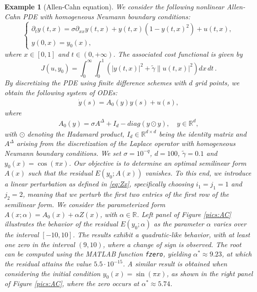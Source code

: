 \documentclass{article}
\newtheorem{example}{Example}[section]
\newcommand{\first}[1]{{\color{black}{#1}}}
\begin{document}
\begin{example}[Allen-Cahn equation]
   We consider the following nonlinear Allen-Cahn PDE with homogeneous Neumann boundary conditions:
\begin{equation*}
\left\{ \begin{array}{l}
\partial_t y(t,x) = \sigma \partial_{xx} y(t,x) + y(t,x) (1-y(t,x)^2) + u(t,x),  \\
 y(0,x)=y_0(x),
\end{array} \right.
\end{equation*}
where $x \in [0,1]$ and $t \in (0,+\infty)$. The associated cost functional is given by
$$
J(u,y_0) = \int_0^{\infty}  \int_0^1 (|y(t,x)|^2 +  \tilde{\gamma}\|u(t,x)|^2) dx \, dt \,.
$$
By discretizing the PDE using finite difference schemes with $d$ grid points, we obtain the following system of ODEs:
\begin{align*}
\dot{y}(s)=A_0(y) y(s) + u(s),
\end{align*}
where
\begin{align*}
A_0(y) = \sigma A^{\Delta} + I_d -  diag(y \odot y),\quad y \in \mathbb{R}^d, 
\end{align*}
with $\odot$ denoting the Hadamard \first{(element-wise)} product, $I_d \in \mathbb{R}^{d \times d}$ being the identity matrix and $A^{\Delta}$ arising from the discretization of the Laplace operator with homogeneous Neumann boundary conditions. We set $\sigma = 10^{-q}$,  $d=100$, $\tilde{\gamma} = 0.1$ and $y_0(x) = \cos(\pi x)$. Our objective is to determine an optimal semilinear form $A(x)$ such that the residual $E(y_0;A(x))$ vanishes. To this end, we introduce a linear perturbation as defined in \eqref{eq:Zx}, specifically choosing $i_1=j_1=1$ and $j_2=2$, meaning that we perturb the first two entries of the first row of the semilinear form. We consider the parameterized form $A(x;\alpha) = A_0(x)+ \alpha Z(x)$, with $\alpha \in \mathbb{R}$. Left panel of Figure \ref{pics:AC} illustrates the behavior of the residual $E(y_0;\alpha)$ as the parameter $\alpha$ varies over the interval $[-10,10]$. The results exhibit a quadratic-like behavior, with at least one zero in the interval $(9,10)$, where a change of sign is observed. The root can be computed using the MATLAB function \texttt{fzero}, yielding $\alpha^* \approx 9.23 $, at which the residual attains the value $5.5 \cdot 10^{-15}$.
A similar result is obtained when considering the initial condition $y_0(x) = \sin (\pi x)$, as shown in the right panel of Figure \ref{pics:AC}, where the zero occurs at $\alpha^* \approx 5.74 $.


\end{example}
\end{document}
